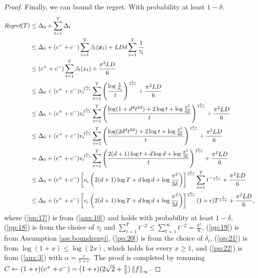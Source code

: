 \begin{proof}
	Finally, we can bound the regret. With probability at least $1-\delta$:
	\begin{align}
		\Reg(T) &\leq \Delta_0 + \sum_{t=1}^{T}\Delta_t \nonumber\\
		&\leq \Delta_0 + (c^{+}+c^{-})\sum_{t=1}^{T}\beta_t(\vx_t) + LDd\sum_{t=1}^{T}\frac{1}{\tau_t} \label{pp:17}\\
		&\leq (c^{+}+c^{-})\sum_{t=1}^{T}\beta_t(x_t) + \frac{\pi^2LD}{6} \label{pp:18}\\
		&\leq \Delta_0 + (c^{+}+c^{-})v_{\epsilon}^{\frac{\epsilon}{1+\epsilon}}\sum_{t=1}^{T}\left(\frac{\log\frac{1}{\delta_t}}{t}\right)^{\frac{\epsilon}{1+\epsilon}} + \frac{\pi^2LD}{6} \label{pp:19}\\
		&\leq \Delta_0 + (c^{+}+c^{-})v_{\epsilon}^{\frac{\epsilon}{1+\epsilon}}\sum_{t=1}^{T}\left(\frac{
			\log (1+d^dt^{2d}) + 2\log t + \log\frac{\pi^2}{6\delta}
		}{t}\right)^{\frac{\epsilon}{1+\epsilon}} + \frac{\pi^2LD}{6} \label{pp:20}\\
		&\leq \Delta_0 + (c^{+}+c^{-})v_{\epsilon}^{\frac{\epsilon}{1+\epsilon}}\sum_{t=1}^{T}\left(\frac{
		\log (2d^dt^{2d}) + 2\log t + \log\frac{\pi^2}{6\delta}
		}{t}\right)^{\frac{\epsilon}{1+\epsilon}} + \frac{\pi^2LD}{6} \label{pp:21}\\
		&= \Delta_0 + (c^{+}+c^{-})v_{\epsilon}^{\frac{\epsilon}{1+\epsilon}}\sum_{t=1}^{T}\left(\frac{
		2(d+1)\log t + d\log d + \log\frac{\pi^2}{3\delta}
		}{t}\right)^{\frac{\epsilon}{1+\epsilon}} + \frac{\pi^2LD}{6} \nonumber\\
		&\leq \Delta_0 + (c^{+}+c^{-})\left[v_{\epsilon}\left(
			2(d+1)\log T + d\log d + \log\frac{\pi^2}{3\delta}
		\right)\right]^{\frac{\epsilon}{1+\epsilon}}\sum_{t=1}^{T}
		t^{-\frac{\epsilon}{1+\epsilon}} + \frac{\pi^2LD}{6} 	\nonumber\\
		&\leq \Delta_0 + (c^{+}+c^{-})\left[v_{\epsilon}\left(
		2(d+1)\log T + d\log d + \log\frac{\pi^2}{3\delta}
		\right)\right]^{\frac{\epsilon}{1+\epsilon}}(1+\epsilon)T^{\frac{1}{1+\epsilon}}+ \frac{\pi^2LD}{6}, 	\label{pp:22}
	\end{align}
	where (\ref{pp:17}) is from (\ref{aux:10}) and holds with probability at least $1-\delta$, (\ref{pp:18}) is from the choice of $\tau_t$ and $\sum_{t=1}^{T}t^{-2}\leq\sum_{t=1}^{\infty}t^{-2} = \frac{\pi^2}{6}$, (\ref{pp:19}) is from Assumption \ref{ass:boundrenyi}, (\ref{pp:20}) is from the choice of $\delta_t$, (\ref{pp:21}) is from $\log(1+x)\leq\log(2x)$, which holds for every $x\geq 1$, and (\ref{pp:22}) is from  (\ref{aux:3}) with $\alpha=\frac{\epsilon}{1+\epsilon}$. 
	The proof is completed by renaming $C\gets (1+\epsilon)(c^{+}+c^{-}) = (1+\epsilon)(2\sqrt{2} + \frac{5}{3})\norm[\infty]{f}$.
\end{proof}

